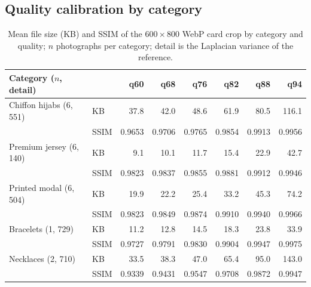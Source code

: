 \documentclass[sigconf,nonacm,screen]{acmart}
\begin{document}
\subsection{Quality calibration by category}
\label{sec:calibration}

\begin{table}[t]
\caption{Mean file size (KB) and SSIM of the $600\times800$ WebP card crop by category and quality; $n$ photographs per category; detail is the Laplacian variance of the reference.}
\label{tab:calib}
\footnotesize
\setlength{\tabcolsep}{3.5pt}
\begin{tabular}{@{}llrrrrrr@{}}
\toprule
Category ($n$, detail) & & q60 & q68 & q76 & q82 & q88 & q94 \\
\midrule
Chiffon hijabs (6, 551) & KB & 37.8 & 42.0 & 48.6 & 61.9 & 80.5 & 116.1 \\
 & SSIM & 0.9653 & 0.9706 & 0.9765 & 0.9854 & 0.9913 & 0.9956 \\
Premium jersey (6, 140) & KB & 9.1 & 10.1 & 11.7 & 15.4 & 22.9 & 42.7 \\
 & SSIM & 0.9823 & 0.9837 & 0.9855 & 0.9881 & 0.9912 & 0.9946 \\
Printed modal (6, 504) & KB & 19.9 & 22.2 & 25.4 & 33.2 & 45.3 & 74.2 \\
 & SSIM & 0.9823 & 0.9849 & 0.9874 & 0.9910 & 0.9940 & 0.9966 \\
Bracelets (1, 729) & KB & 11.2 & 12.8 & 14.5 & 18.3 & 23.8 & 33.9 \\
 & SSIM & 0.9727 & 0.9791 & 0.9830 & 0.9904 & 0.9947 & 0.9975 \\
Necklaces (2, 710) & KB & 33.5 & 38.3 & 47.0 & 65.4 & 95.0 & 143.0 \\
 & SSIM & 0.9339 & 0.9431 & 0.9547 & 0.9708 & 0.9872 & 0.9947 \\
\bottomrule
\end{tabular}
\end{table}
\end{document}
